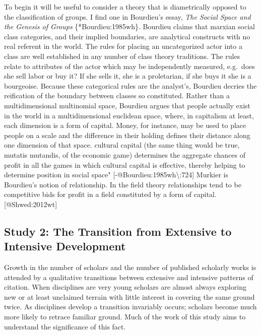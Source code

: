 \documentclass[]{article}
\begin{document}
To begin it will be useful to consider a theory that is diametrically
opposed to the classification of groups. I find one in Bourdieu's essay,
\emph{The Social Space and the Genesis of Groups} \{*Bourdieu:1985wh\}.
Bourdieu claims that marxian social class categories, and their implied
boundaries, are analytical constructs with no real referent in the
world. The rules for placing an uncategorized actor into a class are
well established in any number of class theory traditions. The rules
relate to attributes of the actor which may be independently measured,
e.g.~does she sell labor or buy it? If she sells it, she is a
proletarian, if she buys it she is a bourgeoise. Because these
categorical rules are the analyst's, Bourdieu decries the reification of
the boundary between classes so constituted. Rather than a
multidimensional multinomial space, Bourdieu argues that people actually
exist in the world in a multidimensional euclidean space, where, in
capitalism at least, each dimension is a form of capital. Money, for
instance, may be used to place people on a scale and the difference in
their holding defines their distance along one dimension of that space.
cultural capital (the same thing would be true, mutatis mutandis, of the
economic game) determines the aggregate chances of profit in all the
games in which cultural capital is effective, thereby helping to
determine position in social space"
{[}-@Bourdieu:1985wh\textbackslash{}:724{]} Murkier is Bourdieu's notion
of relationship. In the field theory relationships tend to be
competitive bids for profit in a field constituted by a form of capital.
{[}@Shwed:2012wt{]}

\subsection{Study 2: The Transition from Extensive to Intensive
Development}\label{study-2-the-transition-from-extensive-to-intensive-development}

Growth in the number of scholars and the number of published scholarly
works is attended by a qualitative transitions between extensive and
intensive patterns of citation. When disciplines are very young scholars
are almost always exploring new or at least unclaimed terrain with
little interest in covering the same ground twice. As disciplines
develop a transition invariably occurs; scholars become much more likely
to retrace familiar ground. Much of the work of this study aims to
understand the significance of this fact.
\end{document}
